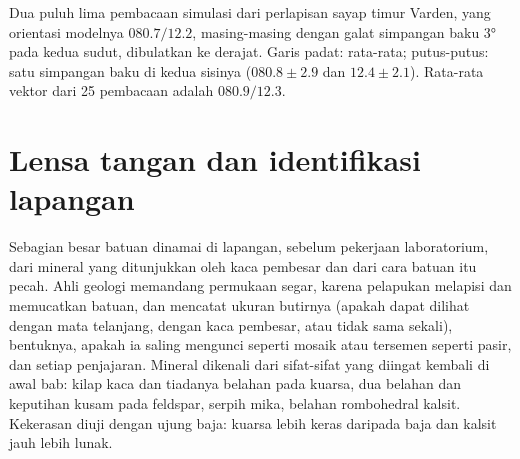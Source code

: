 \begin{omfigure}

{\small Dua puluh lima pembacaan simulasi dari perlapisan sayap timur Varden, yang orientasi modelnya $080.7/12.2$, masing-masing dengan galat simpangan baku \ang{3} pada kedua sudut, dibulatkan ke derajat. Garis padat: rata-rata; putus-putus: satu simpangan baku di kedua sisinya ($080.8 \pm 2.9$ dan $12.4 \pm 2.1$). Rata-rata vektor dari 25 pembacaan adalah $080.9/12.3$.}
\end{omfigure}

\section{Lensa tangan dan identifikasi lapangan}

Sebagian besar batuan dinamai di lapangan, sebelum pekerjaan laboratorium, dari mineral yang ditunjukkan oleh kaca pembesar dan dari cara batuan itu pecah. Ahli geologi memandang permukaan segar, karena pelapukan melapisi dan memucatkan batuan, dan mencatat ukuran butirnya (apakah dapat dilihat dengan mata telanjang, dengan kaca pembesar, atau tidak sama sekali), bentuknya, apakah ia saling mengunci seperti mosaik atau tersemen seperti pasir, dan setiap penjajaran. Mineral dikenali dari sifat-sifat yang diingat kembali di awal bab:
kilap kaca dan tiadanya belahan pada kuarsa, dua belahan dan keputihan kusam pada feldspar, serpih mika, belahan rombohedral kalsit. Kekerasan diuji dengan ujung baja: kuarsa lebih keras daripada baja dan kalsit jauh lebih lunak.

